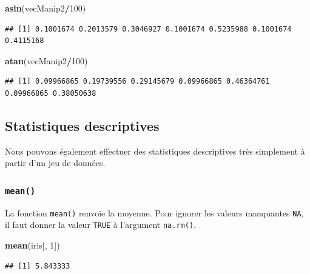 \documentclass[
]{book}
\newenvironment{Shaded}{\begin{snugshade}}{\end{snugshade}}
\newcommand{\DecValTok}[1]{\textcolor[rgb]{0.00,0.00,0.81}{#1}}
\newcommand{\KeywordTok}[1]{\textcolor[rgb]{0.13,0.29,0.53}{\textbf{#1}}}
\newcommand{\NormalTok}[1]{#1}
\newcommand{\OperatorTok}[1]{\textcolor[rgb]{0.81,0.36,0.00}{\textbf{#1}}}
\begin{document}
\begin{Shaded}
\begin{Highlighting}[]
\KeywordTok{asin}\NormalTok{(vecManip2}\OperatorTok{/}\DecValTok{100}\NormalTok{)}
\end{Highlighting}
\end{Shaded}

\begin{verbatim}
## [1] 0.1001674 0.2013579 0.3046927 0.1001674 0.5235988 0.1001674 0.4115168
\end{verbatim}

\begin{Shaded}
\begin{Highlighting}[]
\KeywordTok{atan}\NormalTok{(vecManip2}\OperatorTok{/}\DecValTok{100}\NormalTok{)}
\end{Highlighting}
\end{Shaded}

\begin{verbatim}
## [1] 0.09966865 0.19739556 0.29145679 0.09966865 0.46364761 0.09966865 0.38050638
\end{verbatim}

\hypertarget{statistiques-descriptives}{%
\subsection{Statistiques descriptives}\label{statistiques-descriptives}}

Nous pouvons également effectuer des statistiques descriptives très simplement à partir d'un jeu de données.

\hypertarget{l015mean}{%
\subsubsection{\texorpdfstring{\texttt{mean()}}{mean()}}\label{l015mean}}

La fonction \texttt{mean()} renvoie la moyenne. Pour ignorer les valeurs manquantes \texttt{NA}, il faut donner la valeur \texttt{TRUE} à l'argument \texttt{na.rm()}.

\begin{Shaded}
\begin{Highlighting}[]
\KeywordTok{mean}\NormalTok{(iris[, }\DecValTok{1}\NormalTok{])}
\end{Highlighting}
\end{Shaded}

\begin{verbatim}
## [1] 5.843333
\end{verbatim}
\end{document}
